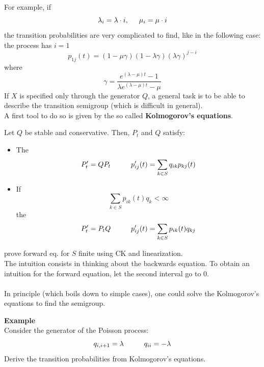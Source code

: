 \documentclass{article}
\begin{document}
For example, if 
\begin{equation*}
    \lambda_i = \lambda \cdot i, \hspace{0.5 cm} \mu_i = \mu \cdot i
\end{equation*}
the transition probabilities are very complicated to find, like in the following case: the process has $i = 1$
\begin{equation*}
    p_{1j}(t) = (1-\mu \gamma) (1-\lambda \gamma) (\lambda \gamma)^{j-i}
\end{equation*}
where 
\begin{equation*}
    \gamma= \frac{e^{(\lambda-\mu) t} - 1}{\lambda e^{(\lambda - \mu)t}-\mu}
\end{equation*}
If $X$ is specified only through the generator $Q$, a general task is to be able to describe the transition semigroup (which is difficult in general). \\
A first tool to do so is given by the so called \textbf{Kolmogorov's equations}.
    \begin{theorem}
        Let $Q$ be stable and conservative. Then, $P_t$ and $Q$ satisfy:
        \begin{itemize}
            \item The 
            \begin{equation*}
                P'_t =  Q P_t \hspace{1 cm} p'_{ij}(t) = \sum_{k \in S} q_{ik}p_{kj}(t)
            \end{equation*}
            \item If 
            \begin{equation*}
                \sum_{k \in S} p_{ik}(t) q_k < \infty
            \end{equation*}
            the 
            \begin{equation*}
                P'_t = P_t Q \hspace{1 cm} p'_{ij}(t) = \sum_{k \in S} p_{ik}(t)q_{kj}
            \end{equation*}
        \end{itemize}
    \end{theorem}
\begin{exercise}
    prove forward eq. for $S$ finite using CK and linearization.\\
The intuition consists in thinking about the backwards equation.
To obtain an intuition for the forward equation, let the second interval go to $0$.\\
\\
In principle (which boils down to simple cases), one could solve the Kolmogorov's equations to find the semigroup. \\
\end{exercise}
\textbf{Example} \\
Consider the generator of the Poisson process:
\begin{equation*}
    q_{i,i+1}=\lambda \hspace{1 cm} q_{ii} = - \lambda
\end{equation*}
Derive the transition probabilities from Kolmogorov's equations.
\end{document}
